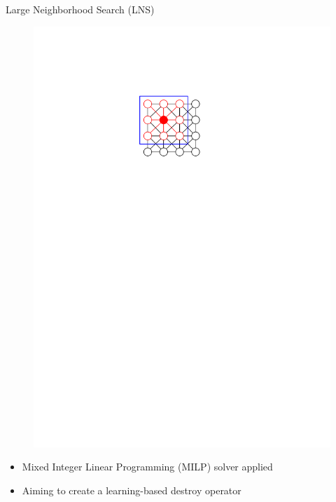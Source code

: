 \documentclass[aspectratio=1610]{beamer}
\newcommand{\important}[1]{{\color{green!60!black}#1}}
\begin{document}
\begin{frame}{Large Neighborhood Search (LNS)}
\begin{figure}
\begin{overprint}
			\centering\includegraphics[width=\textwidth, page=9]{figures/graphics.pdf}
		\end{overprint}
	\end{figure}
	\begin{itemize}
		\item {} Mixed Integer Linear Programming (MILP) solver applied
		\item<2> Aiming to create a \important{learning-based destroy operator}
	\end{itemize}
\end{frame}
\end{document}
